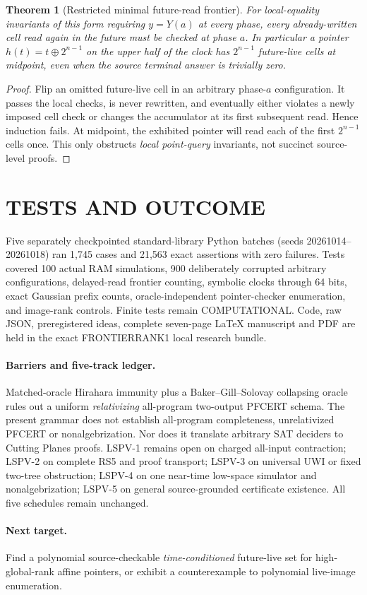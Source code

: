 \documentclass[11pt]{article}
\newtheorem{theorem}{Theorem}
\begin{document}
\begin{theorem}[Restricted minimal future-read frontier]
For local-equality invariants of this form requiring $y=Y(a)$ at every phase, every already-written cell read again in the future must be checked at phase $a$. In particular a pointer $h(t)=t\oplus2^{n-1}$ on the upper half of the clock has $2^{n-1}$ future-live cells at midpoint, even when the source terminal answer is trivially zero.
\end{theorem}
\begin{proof}
Flip an omitted future-live cell in an arbitrary phase-$a$ configuration. It passes the local checks, is never rewritten, and eventually either violates a newly imposed cell check or changes the accumulator at its first subsequent read. Hence induction fails. At midpoint, the exhibited pointer will read each of the first $2^{n-1}$ cells once. This only obstructs \emph{local point-query} invariants, not succinct source-level proofs.
\end{proof}
\section{TESTS AND OUTCOME}
Five separately checkpointed standard-library Python batches (seeds 20261014--20261018) ran 1,745 cases and 21,563 exact assertions with zero failures. Tests covered 100 actual RAM simulations, 900 deliberately corrupted arbitrary configurations, delayed-read frontier counting, symbolic clocks through 64 bits, exact Gaussian prefix counts, oracle-independent pointer-checker enumeration, and image-rank controls. Finite tests remain COMPUTATIONAL. Code, raw JSON, preregistered ideas, complete seven-page LaTeX manuscript and PDF are held in the exact FRONTIERRANK1 local research bundle.
\paragraph{Barriers and five-track ledger.}
Matched-oracle Hirahara immunity plus a Baker--Gill--Solovay collapsing oracle rules out a uniform \emph{relativizing} all-program two-output PFCERT schema. The present grammar does not establish all-program completeness, unrelativized PFCERT or nonalgebrization. Nor does it translate arbitrary SAT deciders to Cutting Planes proofs. LSPV-1 remains open on charged all-input contraction; LSPV-2 on complete RS5 and proof transport; LSPV-3 on universal UWI or fixed two-tree obstruction; LSPV-4 on one near-time low-space simulator and nonalgebrization; LSPV-5 on general source-grounded certificate existence. All five schedules remain unchanged.
\paragraph{Next target.}
Find a polynomial source-checkable \emph{time-conditioned} future-live set for high-global-rank affine pointers, or exhibit a counterexample to polynomial live-image enumeration.
\end{document}
